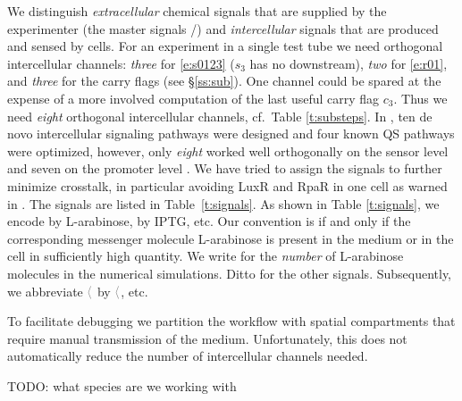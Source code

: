 \documentclass[12pt,notitlepage]{article}
\newcommand{\TODO}[1]{\textrm{\color{red}TODO: #1}}
\newcommand{\cbra}[1]{{\ensuremath{\color{gray}{#1}}}}
\newcommand{\signal}[1]{{{\cbra{\langle}\ce{#1}\cbra{\rangle}}}}
\newcommand{\ra}[1]{{\color{Blue}#1}}
\begin{document}
We distinguish
\emph{extracellular} chemical signals 
that are supplied by the experimenter
(the master signals /)
and
\emph{intercellular} signals
that are produced and sensed by cells.
%
%
%
For an experiment in a single test tube 
we need
orthogonal intercellular channels:
\emph{three} for \eqref{e:s0123}
($s_3$ has no downstream),
\emph{two} for \eqref{e:r01},
and
\emph{three} for the carry flags
(see \S\ref{ss:sub}).
%
One channel could be spared 
at the expense
of a more involved computation of 
the last useful carry flag $c_3$.
%
Thus we need \emph{eight} orthogonal intercellular channels,
cf.~Table \ref{t:substeps}.
%
In \cite{DuETAL2020},
ten de novo intercellular signaling pathways
were designed
and
four known QS pathways
were optimized,
however,
only \emph{eight} worked well orthogonally
on the sensor level 
and 
seven on the promoter level
\cite[\href{https://www.nature.com/articles/s41467-020-17993-w/figures/3}{Fig.~3c/g}]{DuETAL2020}.
%
We have tried to assign the signals
to further minimize crosstalk,
in particular 
avoiding LuxR and RpaR in one cell
as warned in \cite[p.6]{DuETAL2020}.
%
The signals are listed in
Table~\ref{t:signals}.
%
%
%
\ra{
As shown in Table \ref{t:signals},
we encode  by L-arabinose,
\ce{w_B} by IPTG, etc.
%
Our convention is \ce{w_A = 1}
if and only if
the corresponding messenger molecule L-arabinose 
is present in the medium or in the cell 
in sufficiently high quantity.
%
We write \ce{\#w_A}
for
the \emph{number} of L-arabinose molecules 
in the numerical simulations.
%
Ditto for the other signals.
}
%
%
\ra{
Subsequently, we abbreviate
\signal{{3OC6}{-}HSL} by \signal{{3OC6}}, etc.
}
%





%

\ra{
To facilitate debugging
we partition the workflow
with spatial compartments
that require manual transmission of 
the medium.
%
Unfortunately, this does not automatically reduce
the number of intercellular channels needed.
}


\TODO{what species are we working with}
\end{document}
